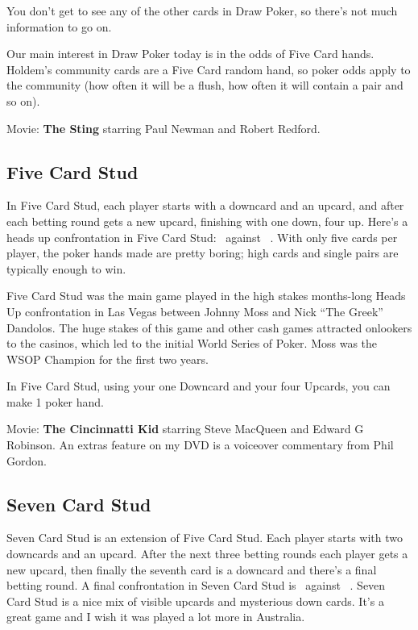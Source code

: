 You don't get to see any of the other cards in Draw Poker, so there's
not much information to go on.

Our main interest in Draw Poker today is in the odds of Five Card
hands. Holdem's community cards are a Five Card random hand, so poker
odds apply to the community (how often it will be a flush, how often
it will contain a pair and so on).

Movie: \textbf{The Sting} starring Paul Newman and Robert Redford.

\subsection{Five Card Stud}

In Five Card Stud, each player starts with a downcard and an upcard,
and after each betting round gets a new upcard, finishing with one
down, four up. Here's a heads up confrontation in Five Card Stud:
\back\nines\Qc\Jc\tred\ against \back\fourh\Jh\tend\trec\ . With
only five cards per player, the poker hands made are pretty boring;
high cards and single pairs are typically enough to win.

Five Card Stud was the main game played in the high stakes months-long
Heads Up confrontation in Las Vegas between Johnny Moss and Nick ``The
Greek'' Dandolos. The huge stakes of this game and other cash games
attracted onlookers to the casinos, which led to the initial World
Series of Poker. Moss was the WSOP Champion for the first two years.

In Five Card Stud, using your one Downcard and your four Upcards, you
can make 1 poker hand.

Movie: \textbf{The Cincinnatti Kid} starring Steve MacQueen and Edward G
Robinson. An extras feature on my DVD is a voiceover commentary from
Phil Gordon.

\subsection{Seven Card Stud}

Seven Card Stud is an extension of Five Card Stud. Each player starts
with two downcards and an upcard. After the next three betting rounds
each player gets a new upcard, then finally the seventh card is a
downcard and there's a final betting round. A final confrontation in
Seven Card Stud is \back\back\nines\Qd\Jd\tred\back\ against
\back\back\fourh\Jh\tend\trec\back\ . Seven Card Stud is a nice mix of
visible upcards and mysterious down cards. It's a great game and I
wish it was played a lot more in Australia.

